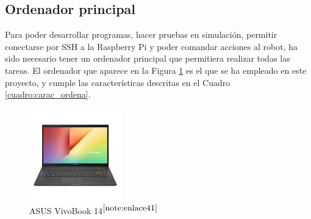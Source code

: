 \setcounter{footnote}{40} %

\subsection{Ordenador principal}
\label{subsec:ordenador}

Para poder desarrollar programas, hacer pruebas en simulación, permitir conectarse por SSH a la Raspberry Pi y poder comandar acciones al robot, ha sido necesario tener un ordenador principal que permitiera realizar todas las tareas. El ordenador que aparece en la Figura \ref{fig:ordenador} es el que se ha empleado en este proyecto, y cumple las características descritas en el Cuadro \ref{cuadro:carac_ordena}.


\begin{figure} [h!]
	\begin{center}
		\includegraphics[width=4cm]{figs/ordenador.png}
	\end{center}
	\caption{ASUS VivoBook 14$^{\ref{note:enlace41}}$} 
	\label{fig:ordenador}
\end{figure}

\setcounter{footnote}{41} %

